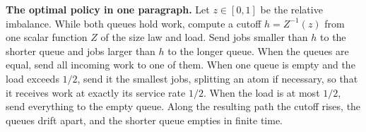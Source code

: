\documentclass[11pt]{article}
\numberwithin{equation}{section}
\theoremstyle{definition}
\theoremstyle{remark}
\begin{document}
\begin{framed}
\noindent\textbf{The optimal policy in one paragraph.} Let $z\in[0,1]$ be the relative imbalance. While both queues hold work, compute a cutoff $h=Z^{-1}(z)$ from one scalar function $Z$ of the size law and load. Send jobs smaller than $h$ to the shorter queue and jobs larger than $h$ to the longer queue. When the queues are equal, send all incoming work to one of them. When one queue is empty and the load exceeds $1/2$, send it the smallest jobs, splitting an atom if necessary, so that it receives work at exactly its service rate $1/2$. When the load is at most $1/2$, send everything to the empty queue. Along the resulting path the cutoff rises, the queues drift apart, and the shorter queue empties in finite time.
\end{framed}
\end{document}
